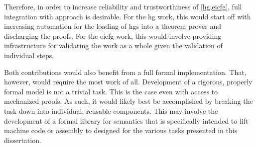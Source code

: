Therefore, in order to increase reliability and trustworthiness of \cref{hg,eicfg}, full integration with  approach is desirable.
For the \gls{hg} work, this would start off with increasing automation for the loading of \glspl{hg} into a theorem prover and discharging the proofs.
For the \gls{eicfg} work, this would involve providing  infrastructure for validating the work as a whole given the validation of individual steps.

Both contributions would also benefit from a full formal implementation.
That, however, would require the most work of all.
Development of a rigorous, properly formal model is not a trivial task.
This is the case even with access to mechanized proofs.
As such, it would likely best be accomplished by breaking the task down into individual, reusable components.
This may involve the development of a formal library for semantics that is specifically intended to lift machine code or assembly to  designed for the various tasks presented in this dissertation.
